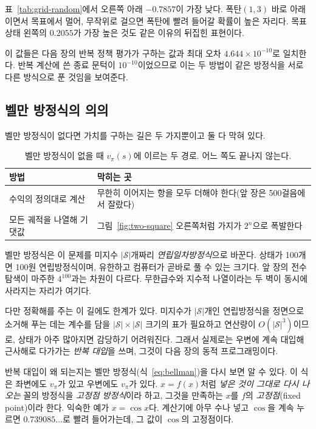 \documentclass[11pt,a4paper]{article}
\newcommand{\Sset}{\mathcal{S}}
\begin{document}
표~\ref{tab:grid-random}에서 오른쪽 아래 $-0.7857$이 가장 낮다. 폭탄$(1,3)$ 바로 아래이면서 목표에서
멀어, 무작위로 걸으면 폭탄에 빨려 들어갈 확률이 높은 자리다. 목표 상태 왼쪽의 $0.2055$가 가장 높은 것도
같은 이유의 뒤집힌 표현이다.

이 값들은 다음 장의 반복 정책 평가가 구하는 값과 최대 오차 $4.644\times10^{-10}$로 일치한다. 반복 계산에
쓴 종료 문턱이 $10^{-10}$이었으므로 이는 두 방법이 같은 방정식을 서로 다른 방식으로 푼 것임을 보여준다.

\subsection{벨만 방정식의 의의}
\label{sec:significance}

벨만 방정식이 없다면 가치를 구하는 길은 두 가지뿐이고 둘 다 막혀 있다.

\begin{table}[htbp]
\centering
\caption{벨만 방정식이 없을 때 $v_\pi(s)$에 이르는 두 경로. 어느 쪽도 끝나지 않는다.}
\label{tab:no-bellman}
\small
\begin{tabular}{@{}ll@{}}
\toprule
방법 & 막히는 곳 \\
\midrule
수익의 정의대로 계산    & 무한히 이어지는 항을 모두 더해야 한다(앞 장은 500걸음에서 잘랐다) \\
모든 궤적을 나열해 기댓값 & 그림~\ref{fig:two-square} 오른쪽처럼 가지가 $2^n$으로 폭발한다 \\
\bottomrule
\end{tabular}
\end{table}

벨만 방정식은 이 문제를 미지수 $|\Sset|$개짜리 \emph{연립일차방정식}으로 바꾼다. 상태가 100개면 100원
연립방정식이며, 유한하고 컴퓨터가 곧바로 풀 수 있는 크기다. 앞 장의 전수 탐색이 마주한 $4^{100}$과는
차원이 다르다. 무한급수와 지수적 나열이라는 두 벽이 동시에 사라지는 자리가 여기다.

다만 정확해를 주는 이 길에도 한계가 있다. 미지수가 $|\Sset|$개인 연립방정식을 정면으로 소거해 푸는 데는
계수를 담을 $|\Sset|\times|\Sset|$ 크기의 표가 필요하고 연산량이 $O(|\Sset|^3)$이므로, 상태가 아주
많아지면 감당하기 어려워진다. 그래서 실제로는 우변에 계속 대입해 근사해로 다가가는 \emph{반복 대입}을 쓰며, 그것이 다음 장의
동적 프로그래밍이다.

반복 대입이 왜 되는지는 벨만 방정식(식~\eqref{eq:bellman})을 다시 보면 알 수 있다. 이 식은 좌변에도
$v_\pi$가 있고 우변에도 $v_\pi$가 있다. $x=f(x)$처럼 \emph{넣은 것이 그대로 다시 나오는} 꼴의 방정식을
\emph{고정점 방정식}이라 하고, 그것을 만족하는 $x$를 $f$의 \emph{고정점}(fixed point)이라 한다. 익숙한
예가 $x=\cos x$다. 계산기에 아무 수나 넣고 $\cos$을 계속 누르면 $0.739085\ldots$로 빨려 들어가는데, 그
값이 $\cos$의 고정점이다.
\end{document}
